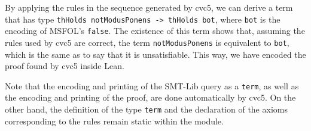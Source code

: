 By applying the rules in the sequence generated by cvc5, we can derive a term
that has type \texttt{thHolds notModusPonens -> thHolds bot}, where \texttt{bot}
is the encoding of MSFOL's \texttt{false}.
%
The existence of this term shows that, assuming the rules used by cvc5 are correct, the term \texttt{notModusPonens} is equivalent to \texttt{bot}, which is the same as to say that it is unsatisfiable. This way, we have encoded the proof found by cvc5 inside Lean.

Note that the encoding and printing of the SMT-Lib query as a \texttt{term}, as well as the encoding and printing of the proof, are done automatically by cvc5. On the other hand, the definition of the type \texttt{term} and the declaration of the axioms corresponding to the rules remain static within the module.
